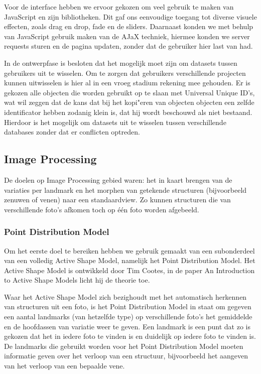 Voor de interface hebben we ervoor gekozen om veel gebruik te maken van JavaScript en zijn bibliotheken. Dit gaf ons eenvoudige toegang tot diverse visuele effecten, zoals drag en drop, fade en de sliders. Daarnaast konden we met behulp van JavaScript gebruik maken van de AJaX techniek, hiermee konden we server requests sturen en de pagina updaten, zonder dat de gebruiker hier last van had.

In de ontwerpfase is besloten dat het mogelijk moet zijn om datasets tussen gebruikers uit te wisselen. Om te zorgen dat gebruikers verschillende projecten kunnen uitwisselen is hier al in een vroeg stadium rekening mee gehouden. Er is gekozen alle objecten die worden gebruikt op te slaan met Universal Unique ID's, wat wil zeggen dat de kans dat bij het kopi"{e}ren van objecten objecten een zelfde identificator hebben zodanig klein is, dat hij wordt beschouwd als niet bestaand. Hierdoor is het mogelijk om datasets uit te wisselen tussen verschillende databases zonder dat er conflicten optreden.

\subsection{Image Processing}
De doelen op Image Processing gebied waren: het in kaart brengen van de variaties per landmark en het morphen van getekende structuren (bijvoorbeeld zenuwen of venen) naar een standaardview. Zo kunnen structuren die van verschillende foto's afkomen toch op \'{e}\'{e}n foto worden afgebeeld.

\subsubsection{Point Distribution Model}
Om het eerste doel te bereiken hebben we gebruik gemaakt van een subonderdeel van een volledig Active Shape Model, namelijk het Point Distribution Model. Het Active Shape Model is ontwikkeld door Tim Cootes, in de paper An Introduction to Active Shape Models licht hij de theorie toe.\cite{introASM}

Waar het Active Shape Model zich bezighoudt met het automatisch herkennen van structuren uit een foto, is het Point Distribution Model\cite{pdm} in staat om gegeven een aantal landmarks (van hetzelfde type) op verschillende foto's het gemiddelde en de hoofdassen van variatie weer te geven. Een landmark is een punt dat zo is gekozen dat het in iedere foto te vinden is en duidelijk op iedere foto te vinden is. De landmarks die gebruikt worden voor het Point Distribution Model moeten informatie geven over het verloop van een structuur, bijvoorbeeld het aangeven van het verloop van een bepaalde vene.


